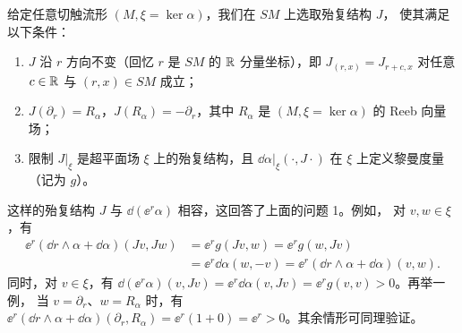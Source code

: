 给定任意切触流形 $(M,\xi=\ker\alpha)$，我们在 $SM$ 上选取殆复结构 $J$，
使其满足以下条件：
\begin{enumerate}[label=(\roman*)]
  \item $J$ 沿 $r$ 方向不变（回忆 $r$ 是 $SM$ 的 $\mathbb{R}$ 分量坐标），即
        $J_{(r,x)}=J_{r+c,x}$ 对任意 $c\in\mathbb{R}$ 与 $(r,x)\in SM$ 成立；
  \item $J(\partial_r)=R_\alpha$，$J(R_\alpha)=-\partial_r$，其中 $R_\alpha$
        是 $(M,\xi=\ker\alpha)$ 的 Reeb 向量场；
  \item 限制 $J|_\xi$ 是超平面场 $\xi$ 上的殆复结构，且
        $\dd\alpha|_\xi(\cdot,J\cdot)$ 在 $\xi$ 上定义黎曼度量（记为 $g$）。
\end{enumerate}
这样的殆复结构 $J$ 与 $\dd(\ee^r\alpha)$ 相容，这回答了上面的问题 1。例如，
对 $v,w\in\xi$，有
\begin{align*}
  \ee^r(\dd r\wedge\alpha+\dd\alpha)(Jv,Jw)
  &=\ee^r g(Jv,w)
   =\ee^r g(w,Jv)\\
  &=\ee^r\dd\alpha(w,-v)
   =\ee^r(\dd r\wedge\alpha+\dd\alpha)(v,w).
\end{align*}
同时，对 $v\in\xi$，有
$\dd(\ee^r\alpha)(v,Jv)=\ee^r\dd\alpha(v,Jv)=\ee^r g(v,v)>0$。再举一例，
当 $v=\partial_r$、$w=R_\alpha$ 时，有
$\ee^r(\dd r\wedge\alpha+\dd\alpha)(\partial_r,R_\alpha)
=\ee^r(1+0)=\ee^r>0$。其余情形可同理验证。


